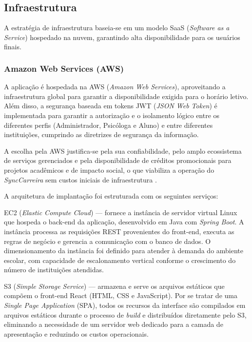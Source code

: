 \subsection{Infraestrutura}

A estratégia de infraestrutura baseia-se em um modelo SaaS (\textit{Software as a Service}) hospedado na nuvem, garantindo alta disponibilidade para os usuários finais.

\subsubsection{Amazon Web Services (AWS)}

A aplicação é hospedada na AWS (\textit{Amazon Web Services}), aproveitando a infraestrutura global para garantir a disponibilidade exigida para o horário letivo. Além disso, a segurança baseada em tokens JWT (\textit{JSON Web Token}) é implementada para garantir a autorização e o isolamento lógico entre os diferentes perfis (Administrador, Psicóloga e Aluno) e entre diferentes instituições, cumprindo as diretrizes de segurança da informação.

A escolha pela AWS justifica-se pela sua confiabilidade, pelo amplo ecossistema de serviços gerenciados e pela disponibilidade de créditos promocionais para projetos acadêmicos e de impacto social, o que viabiliza a operação do \textit{SyncCarreira} sem custos iniciais de infraestrutura \cite{aws2026}.

A arquitetura de implantação foi estruturada com os seguintes serviços:

EC2 (\textit{Elastic Compute Cloud}) — fornece a instância de servidor virtual Linux que hospeda o back-end da aplicação, desenvolvido em Java com \textit{Spring Boot}. A instância processa as requisições REST provenientes do front-end, executa as regras de negócio e gerencia a comunicação com o banco de dados. O dimensionamento da instância foi definido para atender à demanda do ambiente escolar, com capacidade de escalonamento vertical conforme o crescimento do número de instituições atendidas.

S3 (\textit{Simple Storage Service}) — armazena e serve os arquivos estáticos que compõem o front-end React (HTML, CSS e JavaScript). Por se tratar de uma \textit{Single Page Application} (SPA), todos os recursos da interface são compilados em arquivos estáticos durante o processo de \textit{build} e distribuídos diretamente pelo S3, eliminando a necessidade de um servidor web dedicado para a camada de apresentação e reduzindo os custos operacionais.

